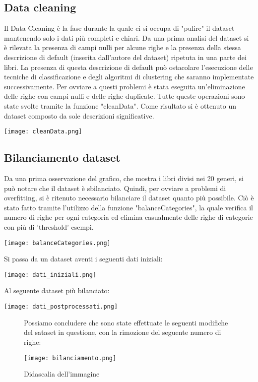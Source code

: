 \documentclass[12pt,oneside]{article}
\begin{document}
    \begin{enumerate}
    \subsection{Data cleaning}
    \begin{justify}
    Il Data Cleaning è la fase durante la quale ci si occupa di "pulire" il dataset mantenendo solo i dati più completi e chiari. Da una prima analisi del dataset si è rilevata la presenza di campi nulli per alcune righe e la presenza della stessa descrizione di default (inserita dall'autore del dataset) ripetuta in una parte dei libri. La presenza di questa descrizione di default può ostacolare l'esecuzione delle tecniche di classificazione e degli algoritmi di clustering che saranno implementate successivamente. Per ovviare a questi problemi è stata eseguita un'eliminazione delle righe con campi nulli e delle righe duplicate. Tutte queste operazioni sono state svolte tramite la funzione "cleanData". Come risultato si è ottenuto un dataset composto da sole descrizioni significative.
    \end{justify}
    \texttt{[image: cleanData.png]}
    \end{enumerate}

    \begin{enumerate}
    \subsection{Bilanciamento dataset}
    \begin{justify}
    Da una prima osservazione del grafico, che mostra i libri divisi nei 20 generi, si può notare che il dataset è sbilanciato. Quindi, per ovviare a problemi di overfitting, si è ritenuto necessario bilanciare il dataset quanto più possibile. Ciò è stato fatto tramite l'utilizzo della funzione "balanceCategories", la quale verifica il numero di righe per ogni categoria ed elimina casualmente delle righe di categorie con più di 'threshold' esempi.
    \end{justify}
    \texttt{[image: balanceCategories.png]}
    \begin{justify}
    Si passa da un dataset aventi i seguenti dati iniziali:
    \end{justify}
    \texttt{[image: dati\_iniziali.png]}
    \begin{justify}
    Al seguente dataset più bilanciato:
    \end{justify}
    \texttt{[image: dati\_postprocessati.png]}


    \begin{wrapfigure}{r}{0.50\textwidth}
    \begin{justify}
    Possiamo concludere che sono state effettuate le seguenti modifiche del sataset in questione, con la rimozione del seguente numero di righe:
    \end{justify}
    \texttt{[image: bilanciamento.png]}
    \caption{Didascalia dell'immagine}
    \label{fig:immagine_esempio}
    \end{wrapfigure}
    \end{enumerate}
\end{document}
